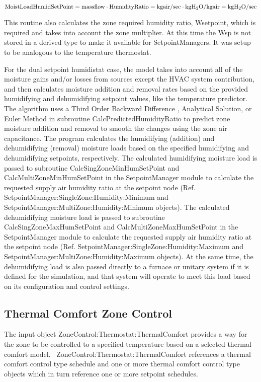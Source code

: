 \begin{equation}
{\rm{MoistLoadHumidSetPoint = massflow}}\cdot {\rm{HumidityRatio = kg air/sec}}\cdot {\rm{kg }}{{\rm{H}}_{\rm{2}}}{\rm{O/kg air = kg }}{{\rm{H}}_{\rm{2}}}{\rm{O/sec}}
\end{equation}

This routine also calculates the zone required humidity ratio, Wsetpoint, which is required and takes into account the zone multiplier. At this time the Wsp is not stored in a derived type to make it available for SetpointManagers. It was setup to be analogous to the temperature thermostat.

For the dual setpoint humidistat case, the model takes into account all of the moisture gains and/or losses from sources except the HVAC system contribution, and then calculates moisture addition and removal rates based on the provided humidifying and dehumidifying setpoint values, like the temperature predictor. The algorithm uses a Third Order Backward Difference , Analytical Solution, or Euler Method in subroutine CalcPredictedHumidityRatio to predict zone moisture addition and removal to smooth the changes using the zone air capacitance. The program calculates the humidifying (addition) and dehumidifying (removal) moisture loads based on the specified humidifying and dehumidifying setpoints, respectively. The calculated humidifying moisture load is passed to subroutine CalcSingZoneMinHumSetPoint and CalcMultiZoneMinHumSetPoint in the SetpointManager module to calculate the requested supply air humidity ratio at the setpoint node (Ref. SetpointManager:SingleZone:Humidity:Minimum and SetpointManager:MultiZone:Humidity:Minimum objects). The calculated dehumidifying moisture load is passed to subroutine CalcSingZoneMaxHumSetPoint and CalcMultiZoneMaxHumSetPoint in the SetpointManager module to calculate the requested supply air humidity ratio at the setpoint node (Ref. SetpointManager:SingleZone:Humidity:Maximum and SetpointManager:MultiZone:Humidity:Maximum objects). At the same time, the dehumidifying load is also passed directly to a furnace or unitary system if it is defined for the simulation, and that system will operate to meet this load based on its configuration and control settings.

\subsection{Thermal Comfort Zone Control}\label{thermal-comfort-zone-control}

The input object ZoneControl:Thermostat:ThermalComfort provides a way for the zone to be controlled to a specified temperature based on a selected thermal comfort model.~ ZoneControl:Thermostat:ThermalComfort references a thermal comfort control type schedule and one or more thermal comfort control type objects which in turn reference one or more setpoint schedules.

